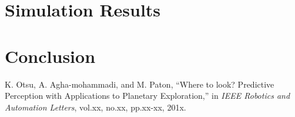\documentclass[conference]{IEEEtran}
\begin{document}




\section{Simulation Results}

\section{Conclusion}

\begin{thebibliography}{1}

K. Otsu, A. Agha-mohammadi, and M. Paton, ``Where to look? Predictive Perception with Applications to Planetary Exploration,'' in {\it IEEE Robotics and Automation Letters}, vol.xx, no.xx, pp.xx-xx, 201x.

\end{thebibliography}
\end{document}
